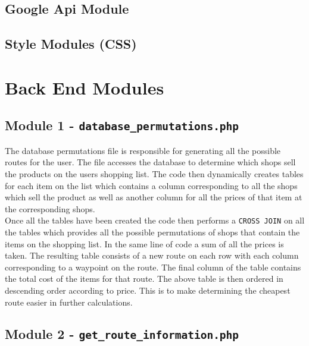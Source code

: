 \documentclass[10pt, a4paper, twocolumn]{scrartcl}
\begin{document}
		
		
		\subsection{Google Api Module}
				
		
		\subsection{}
		
		\subsection{Style Modules (CSS)}
	
	\section{Back End Modules}
		 
			\subsection{Module 1 - \texttt{database\_permutations.php}}
			
				The database permutations file is responsible for generating all the possible routes for the user. The file accesses the database to determine which shops sell the products on the users shopping list. The code then dynamically creates tables for each item on the list which contains a column corresponding to all the shops which sell the product as well as another column for all the prices of that item at the corresponding shops. \\
				
				Once all the tables have been created the code then performs a \texttt{CROSS JOIN} on all the tables which provides all the possible permutations of shops that contain the items on the shopping list. In the same line of code a sum of all the prices is taken. The resulting table consists of a new route on each row with each column corresponding to a waypoint on the route. The final column of the table contains the total cost of the items for that route. The above table is then ordered in descending order according to price. This is to make determining the cheapest route easier in further calculations. 
			
			\subsection{Module 2 - \texttt{get\_route\_information.php}}
			
\end{document}
